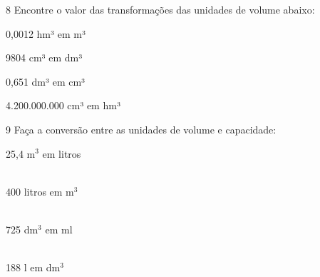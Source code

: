 \num{8} Encontre o valor das transformações das unidades de volume abaixo:

\begin{escolha}[itemsep=0pt]

\item 0,0012 hm³ em m³
 \\

\item 9804 cm³ em dm³
 \\

\item 0,651 dm³ em cm³
 \\

\item 4.200.000.000 cm³ em hm³
 \\

\end{escolha}

\num{9} Faça a conversão entre as unidades de volume e capacidade:

\begin{escolha}[itemsep=0pt]
\item 25,4 m$^3$ em litros \\ \\

\item 400 litros em m$^3$ \\ \\

\item 725 dm$^3$ em ml \\ \\

\item 188 l em dm$^3$ \\ \\

\end{escolha}


